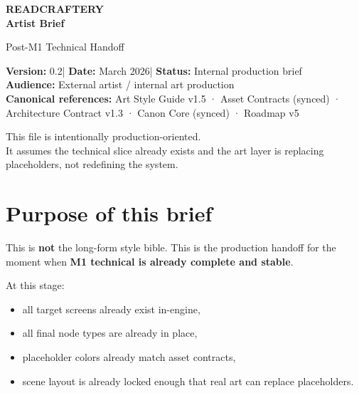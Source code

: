\documentclass[11pt,a4paper]{article}
\newcommand{\docversion}{0.2}
\newcommand{\docdate}{March 2026}
\begin{document}
\begin{titlepage}
\centering
\vspace*{2cm}

{\Huge\bfseries READCRAFTERY\\[0.4em]Artist Brief\par}
\vspace{0.3cm}
{\Large Post-M1 Technical Handoff\par}
\vspace{1cm}

\begin{tcolorbox}[
  width=0.9\linewidth,
  colback=RCParchment,
  colframe=RCLightBorder,
  boxrule=0.7pt,
  arc=1mm,
  auto outer arc
]
\centering
\textbf{Version:} \docversion \quad | \quad
\textbf{Date:} \docdate \quad | \quad
\textbf{Status:} Internal production brief\\[0.5em]
\textbf{Audience:} External artist / internal art production\\[0.5em]
\textbf{Canonical references:} Art Style Guide v1.5 · Asset Contracts (synced) · Architecture Contract v1.3 · Canon Core (synced) · Roadmap v5
\end{tcolorbox}

\vfill

{\large This file is intentionally production-oriented.\\
It assumes the technical slice already exists and the art layer is replacing placeholders, not redefining the system.\par}

\vfill
\end{titlepage}

\section{Purpose of this brief}

This is \textbf{not} the long-form style bible. This is the production handoff for the moment when \textbf{M1 technical is already complete and stable}.

At this stage:
\begin{itemize}
  \item all target screens already exist in-engine,
  \item all final node types are already in place,
  \item placeholder colors already match asset contracts,
  \item scene layout is already locked enough that real art can replace placeholders.
\end{itemize}
\end{document}

